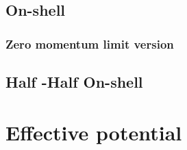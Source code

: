 \subsection{On-shell}
\subsubsection{Zero momentum limit version}
\subsection{Half \texorpdfstring{\MSbar}{MS-bar}-Half On-shell}
\section{Effective potential}

 \\

